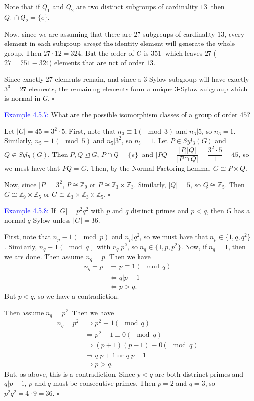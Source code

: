 \documentclass{article}
\begin{document}
Note that if $Q_1$ and $Q_2$ are two distinct subgroups of cardinality $13$, then $Q_1 \cap Q_2 = \{e\}$. 

Now, since we are assuming that there are $27$ subgroups of cardinality $13$, every element in each subgroup \textit{except} the identity 
element will generate the whole group. Then $27 \cdot 12 = 324$. But the order of $G$ is $351$, which leaves $27$ ($27 = 351-324$) elements 
that are not of order $13$.

Since exactly $27$ elements remain, and since a $3$-Sylow subgroup will have exactly $3^3=27$ elements, the remaining elements form a 
unique $3$-Sylow subgroup which is normal in $G$. $\square$

\textcolor{blue}{Example 4.5.7:} What are the possible isomorphism classes of a group of order $45$?

Let $|G|=45 = 3^2 \cdot 5$. First, note that $n_3 \equiv 1(\mod{3})$ and $n_3 | 5$, so $n_3 = 1$. Similarly, $n_5 \equiv 1(\mod{5})$ and 
$n_5 | 3^2$, so $n_5 = 1$. Let $P \in Syl_3(G)$ and $Q \in Syl_5(G)$. Then $P,Q \trianglelefteq G$, $P \cap Q = \{e\}$, and 
$|PQ = \dfrac{|P||Q|}{|P \cap Q|} = \dfrac{3^2 \cdot 5}{1} = 45$, so we must have that $PQ=G$. Then, by the Normal Factoring Lemma, 
$G \cong P \times Q$.

Now, since $|P|=3^2$, $P \cong \mathbb{Z}_9$ or $P \cong \mathbb{Z}_3 \times \mathbb{Z}_3$. Similarly, $|Q| = 5$, so 
$Q \cong \mathbb{Z}_5$. Then $G \cong \mathbb{Z}_9 \times \mathbb{Z}_5$ or $G \cong \mathbb{Z}_3 \times \mathbb{Z}_3 \times \mathbb{Z}_5$. $\square$

\textcolor{blue}{Example 4.5.8:} If $|G| = p^2q^2$ with $p$ and $q$ distinct primes and $p < q$, then $G$ has a normal $q$-Sylow unless 
$|G| = 36$. 

First, note that $n_p \equiv 1(\mod{p})$ and $n_p | q^2$, so we must have that $n_p \in \{1,q,q^2\}$. Similarly, $n_q \equiv 1(\mod{q})$ 
with $n_q | p^2$, so $n_q \in \{1,p,p^2\}$.
Now, if $n_q = 1$, then we are done. Then assume $n_q = p$. Then we have
\begin{align*}
    n_q = p &\Longrightarrow p \equiv 1(\mod{q}) \\
    &\Longleftrightarrow q | p-1 \\
    &\Longleftrightarrow p>q.
\end{align*}
But $p<q$, so we have a contradiction. 

Then assume $n_q = p^2$. Then we have 
\begin{align*}
    n_q = p^2 &\Longrightarrow p^2 \equiv 1(\mod{q}) \\
    &\Longrightarrow p^2-1 \equiv 0(\mod{q}) \\
    &\Longrightarrow (p+1)(p-1) \equiv 0(\mod{q}) \\
    &\Longrightarrow q | p+1 \text{ or } q | p-1 \\
    &\Longrightarrow p>q.
\end{align*}
But, as above, this is a contradiction. Since $p<q$ are both distrinct primes and $q | p+1$, $p$ and $q$ must be consecutive primes. Then 
$p = 2$ and $q=3$, so $p^2q^2 = 4 \cdot 9 = 36$. $\square$
\end{document}
